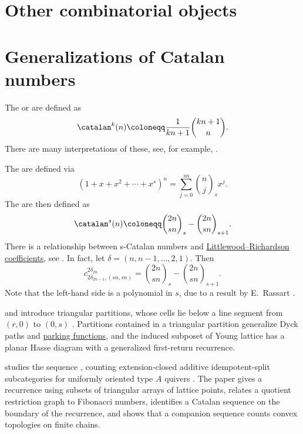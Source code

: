 

\section[combinatorialObjects]{Other combinatorial objects}



\section[fussCatalanObjects]{Generalizations of Catalan numbers}

The  or  are defined as
\[
  \catalan^k(n) \coloneqq \frac{1}{kn+1}\binom{kn+1}{n}.
\]
There are many interpretations of these,
see, for example, \cite{StanleyCatalan}.



The  are defined via
\[
  (1+x+x^2+\dotsb+x^s)^n = \sum_{j=0}^{sn} \binom{n}{j}_s x^j.
\]
The  are then defined as
\[
\catalan^s(n) \coloneqq \binom{2n}{sn}_s  - \binom{2n}{sn}_{s+1}.
\]
There is a relationship between s-Catalan numbers
and \hyperref[littlewoodRichardsonModels]{Littlewood--Richardson coefficients},
see \cite{Linz2021x}.
In fact, let $\delta = (n,n-1,\dotsc,2,1)$.
Then
\[
c^{2 \delta_{2n}}_{2 \delta_{2n-1} , (sn,sn)} = \binom{2n}{sn}_s  - \binom{2n}{sn}_{s+1}.
\]
Note that the left-hand side is a polynomial in $s$, due to
a result by E.~Rassart \cite{Rassart2004}.

 and  introduce triangular
partitions, whose cells lie below a line segment from $(r,0)$ to $(0,s)$
\cite{BergeronMazin2022x}.  Partitions contained in a triangular partition
generalize Dyck paths and \hyperref[parkingFunctions]{parking functions}, and
the induced subposet of Young lattice has a planar Hasse diagram with a
generalized first-return recurrence.

 studies the sequence , counting
extension-closed additive idempotent-split subcategories for uniformly
oriented type $A$ quivers \cite{Mazorchuk2026x}.  The paper gives a
recurrence using subsets of triangular arrays of lattice points, relates a
quotient restriction graph to Fibonacci numbers, identifies a Catalan sequence
on the boundary of the recurrence, and shows that a companion sequence counts
convex topologies on finite chains.


